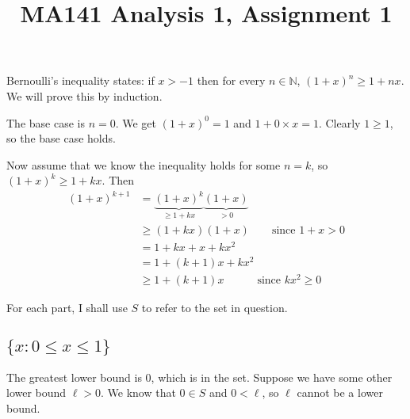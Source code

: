 \documentclass[a4paper]{article}
\title{MA141 Analysis 1, Assignment 1}
\begin{document}
\maketitle

\setlength{\parindent}{0em}
\setlength{\parskip}{1em}


Bernoulli's inequality states: if $x > -1$ then for every $n \in \mathbb{N}$, $(1 + x)^n \ge 1 + nx$. We will prove this by induction.

The base case is $n = 0$. We get $(1 + x)^0 = 1$ and $1 + 0 \times x = 1$. Clearly $1 \ge 1$, so the base case holds.

Now assume that we know the inequality holds for some $n = k$, so $(1 + x)^k \ge 1 + kx$. Then
\begin{align*}
	(1 + x)^{k+1} &= \underbrace{(1 + x)^k}_{\ge 1 + kx} \underbrace{(1 + x)}_{> 0}\\[1ex]
				  &\ge (1 + kx) (1 + x) \qquad\text{since } 1 + x > 0 \\[1ex]
				  &= 1 + kx + x + kx^2\\[1ex]
				  &= 1 + (k+1)x + kx^2\\[1ex]
				  &\ge 1 + (k+1)x \qquad\quad\text{since }kx^2 \ge 0
\end{align*}

%
%


For each part, I shall use $S$ to refer to the set in question.

\subsection{$\{x : 0 \le x \le 1\}$}

The greatest lower bound is $0$, which is in the set. Suppose we have some other lower bound $\ell > 0$. We know that $0 \in S$ and $0 < \ell$, so $\ell$ cannot be a lower bound.
\end{document}
